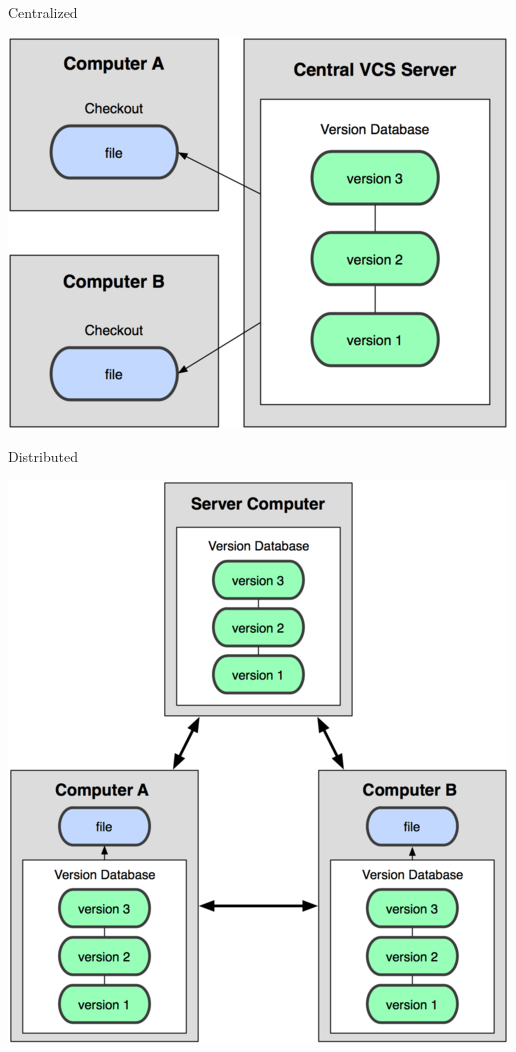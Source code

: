 \begin{frame}
\begin{center}{\large Centralized}\end{center}

  \begin{center}
    \includegraphics[scale=0.5]{img/centralized.png}
  \end{center}

\end{frame}
\begin{frame}
\begin{center}{\large Distributed}\end{center}

  \begin{center}
    \includegraphics[scale=0.4]{img/distributed.png}
  \end{center}

\end{frame}
